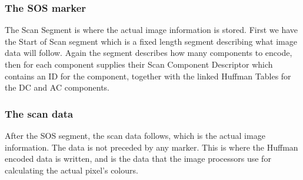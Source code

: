 \begin{infobox}
\subsubsection*{The SOS marker}
\begin{centering}
\end{centering}
The Scan Segment is where the actual image information is stored. First we have the Start of Scan segment which is a fixed length segment describing what image data will follow. Again the segment describes how many components to encode, then for each component supplies their Scan Component Descriptor which contains an ID for the component, together with the linked Huffman Tables for the DC and AC components.

\begin{centering}
\end{centering}

\vspace{4mm}
\subsubsection*{The scan data}
\vspace{-2.5mm}
After the SOS segment, the scan data follows, which is the actual image information.
The data is not preceded by any marker.
This is where the Huffman encoded data is written, and is the data that the image processors use for calculating the actual pixel's colours.


\end{infobox}
